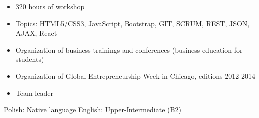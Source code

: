 \documentclass{resume}
\begin{document}
\begin{adjustwidth}{2em}{0em}

\begin{itemize}
    \item 320 hours of workshop
    \item Topics: HTML5/CSS3, JavaScript, Bootstrap, GIT, SCRUM, REST, JSON, AJAX, React
\end{itemize}


\end{adjustwidth}
\vspace{1em}

\begin{multicols}{2}
    \begin{itemize}
        \item Organization of business trainings and conferences (business education for students)
        \item Organization of Global Entrepreneurship Week in Chicago, editions 2012-2014
        \item Team leader
    \end{itemize}
    \columnbreak
    \begin{adjustwidth}{1em}{0em}
    Polish: Native language
    \newline
    English: Upper-Intermediate (B2)
    \end{adjustwidth}
\end{multicols}
\end{document}
